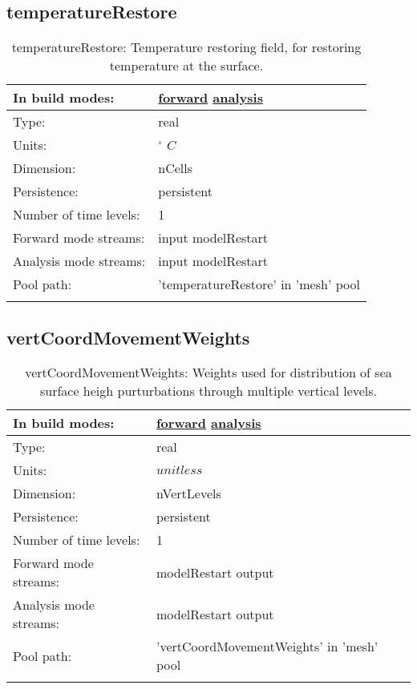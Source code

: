 \subsection[temperatureRestore]{temperatureRestore}
\label{subsec:var_sec_mesh_temperatureRestore}
\begin{center}
\begin{longtable}{| p{2.0in} | p{4.0in} |}
        \hline 
        In build modes: & \hyperref[subsec:forward_var_tab_mesh]{forward} \hyperref[subsec:analysis_var_tab_mesh]{analysis} \\
        \hline 
        Type: & real \\
        \hline 
        Units: & $^\circ$ $C$ \\
        \hline 
        Dimension: & nCells \\
        \hline 
        Persistence: & persistent \\
        \hline 
        Number of time levels: & 1 \\
        \hline 
		 Forward mode streams: &  input modelRestart \\
        \hline 
		 Analysis mode streams: &  input modelRestart \\
        \hline 
            Pool path: & 'temperatureRestore' in 'mesh' pool
 \\
		 \hline 
    \caption{temperatureRestore: Temperature restoring field, for restoring temperature at the surface.}
\end{longtable}
\end{center}
\subsection[vertCoordMovementWeights]{vertCoordMovementWeights}
\label{subsec:var_sec_mesh_vertCoordMovementWeights}
\begin{center}
\begin{longtable}{| p{2.0in} | p{4.0in} |}
        \hline 
        In build modes: & \hyperref[subsec:forward_var_tab_mesh]{forward} \hyperref[subsec:analysis_var_tab_mesh]{analysis} \\
        \hline 
        Type: & real \\
        \hline 
        Units: & $unitless$ \\
        \hline 
        Dimension: & nVertLevels \\
        \hline 
        Persistence: & persistent \\
        \hline 
        Number of time levels: & 1 \\
        \hline 
		 Forward mode streams: &  modelRestart output \\
        \hline 
		 Analysis mode streams: &  modelRestart output \\
        \hline 
            Pool path: & 'vertCoordMovementWeights' in 'mesh' pool
 \\
		 \hline 
    \caption{vertCoordMovementWeights: Weights used for distribution of sea surface heigh purturbations through multiple vertical levels.}
\end{longtable}
\end{center}
